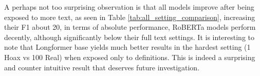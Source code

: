 A perhaps not too surprising observation is that all models improve after being exposed to more text, as seen in Table \ref{tab:all_setting_comparison}, increasing their F1 about 20\Moreover, in terms of absolute performance, RoBERTa models perform decently, although significantly below their full text settings. It is interesting to note that Longformer base yields much better results in the hardest setting (1 Hoax vs 100 Real) when exposed only to definitions. This is indeed a surprising and counter intuitive result that deserves future investigation.
